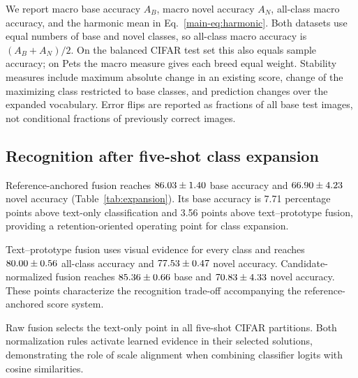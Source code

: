 \documentclass[preprint,review,12pt]{elsarticle}
\begin{document}
We report macro base accuracy $A_B$, macro novel accuracy $A_N$, all-class macro accuracy, and the harmonic mean in Eq.~\eqref{main-eq:harmonic}. Both datasets use equal numbers of base and novel classes, so all-class macro accuracy is $(A_B+A_N)/2$. On the balanced CIFAR test set this also equals sample accuracy; on Pets the macro measure gives each breed equal weight. Stability measures include maximum absolute change in an existing score, change of the maximizing class restricted to base classes, and prediction changes over the expanded vocabulary. Error flips are reported as fractions of all base test images, not conditional fractions of previously correct images.

\subsection{Recognition after five-shot class expansion}
\begin{table}[t]
\centering
\caption{Five-shot expansion from 40 base classes to 80 classes. All values are accuracy percentages, reported as mean $\pm$ sample standard deviation over three distinct class partitions. All readouts share frozen CLIP features; coefficients are selected using base-only calibration. Base and novel performance jointly specify each operating point.}
\label{tab:expansion}
\resizebox{\linewidth}{!}{}
\end{table}

Reference-anchored fusion reaches $86.03\pm1.40$ base accuracy and $66.90\pm4.23$ novel accuracy (Table~\ref{tab:expansion}). Its base accuracy is 7.71 percentage points above text-only classification and 3.56 points above text--prototype fusion, providing a retention-oriented operating point for class expansion.

Text--prototype fusion uses visual evidence for every class and reaches $80.00\pm0.56$ all-class accuracy and $77.53\pm0.47$ novel accuracy. Candidate-normalized fusion reaches $85.36\pm0.66$ base and $70.83\pm4.33$ novel accuracy. These points characterize the recognition trade-off accompanying the reference-anchored score system.

Raw fusion selects the text-only point in all five-shot CIFAR partitions. Both normalization rules activate learned evidence in their selected solutions, demonstrating the role of scale alignment when combining classifier logits with cosine similarities.
\end{document}
